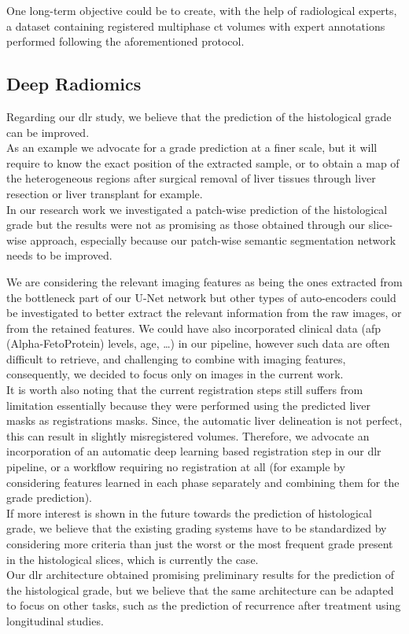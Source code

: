 One long-term objective could be to create, with the help of
radiological experts, a dataset containing registered multiphase \ac{ct}
volumes with expert annotations performed following the aforementioned
protocol.

\subsection*{Deep Radiomics}
\label{subsec:DCR}

Regarding our \ac{dlr} study, we believe that the prediction of the
histological grade can be improved. \\
As an example we advocate for a grade prediction at a finer
scale, but it will require to know the exact position of the extracted
sample, or to obtain a map of the heterogeneous regions after surgical
removal of liver tissues through liver resection or liver transplant for
example.\\
In our research work we investigated a patch-wise prediction of the
histological grade but the results were not as promising as those
obtained through our slice-wise approach, especially because our
patch-wise semantic segmentation network needs to be improved.

We are considering the relevant imaging features as being the
ones extracted from the bottleneck part of our U-Net network but other
types of auto-encoders could be investigated to better
extract the relevant information from the raw images, or from the
retained features. We could have also incorporated clinical
data (\ac{afp} (Alpha-FetoProtein) levels, age, \ldots{}) in our pipeline, however such data are
often difficult to retrieve, and challenging to combine with imaging
features, consequently, we decided to focus only on images in the
current work.\\
It is worth also noting that the current registration steps still suffers from limitation
essentially because they were performed using the predicted liver masks as registrations masks. Since, the automatic liver delineation is not perfect, this can result in slightly misregistered volumes. Therefore, we advocate an incorporation of an automatic deep learning based registration step in our \ac{dlr} pipeline, or a workflow requiring no registration at all (for example by considering features learned in each phase separately and combining them for the grade prediction).\\
If more interest is shown in the future towards the prediction of
histological grade, we believe that the existing grading systems have to
be standardized by considering more criteria than just the worst or the
most frequent grade present in the histological slices, which is
currently the case.\\
Our \ac{dlr} architecture obtained promising preliminary results for the prediction of
the histological grade, but we believe that the same architecture can be
adapted to focus on other tasks, such as the prediction of
recurrence after treatment using longitudinal studies.
